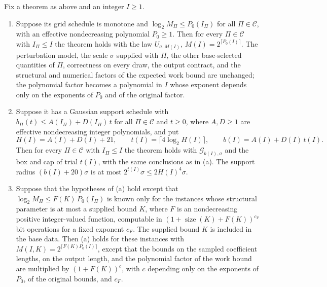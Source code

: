 \begin{corollary}\label{cor:count:universal-law}
Fix a theorem as above and an integer $I\ge1$.
\begin{enumerate}[label=(\alph*)]
\item\label{it:count:ul-grid} Suppose its grid schedule is monotone and
 $\log_2M_\Pi\le P_0(I_\Pi)$ for all $\Pi\in\mathcal C$, with an effective
 nondecreasing polynomial $P_0\ge1$. Then for every $\Pi\in\mathcal C$ with
 $I_\Pi\le I$ the theorem holds with the law $U_{\sigma,M(I)}$,
 $M(I)=2^{\lceil P_0(I)\rceil}$. The perturbation model, the scale $\sigma$
 supplied with $\Pi$, the other base-selected quantities of $\Pi$,
 correctness on every draw, the output contract, and the structural and
 numerical factors of the expected work bound are unchanged; the polynomial
 factor becomes a polynomial in $I$ whose exponent depends only on the
 exponents of $P_0$ and of the original factor.
\item\label{it:count:ul-gauss} Suppose it has a Gaussian support schedule
 with $b_\Pi(t)\le A(I_\Pi)+D(I_\Pi)\,t$ for all $\Pi\in\mathcal C$ and
 $t\ge0$, where $A,D\ge1$ are effective nondecreasing integer polynomials, and
 put
 \[
  H(I)=A(I)+D(I)+21,\qquad t(I)=\lceil4\log_2H(I)\rceil,\qquad
  b(I)=A(I)+D(I)\,t(I).
 \]
 Then for every $\Pi\in\mathcal C$ with $I_\Pi\le I$ the theorem holds with
 $\mathcal G_{b(I),\sigma}$ and the box and cap of trial $t(I)$, with the
 same conclusions as in (a). The support radius $(b(I)+20)\sigma$ is at most
 $2^{t(I)}\sigma\le2H(I)^4\sigma$.
\item\label{it:count:ul-param} Suppose that the hypotheses of (a) hold except
 that $\log_2M_\Pi\le F(K)\,P_0(I_\Pi)$ is known only for the instances whose
 structural parameter is at most a supplied bound $K$, where $F$ is an
 nondecreasing positive integer-valued function, computable in
 $(1+\operatorname{size}(K)+F(K))^{c_F}$ bit operations for a fixed
 exponent $c_F$. The supplied bound $K$ is included in the base data.
 Then (a) holds for these instances with
 $M(I,K)=2^{\lceil F(K)P_0(I)\rceil}$, except that the bounds on the sampled
 coefficient lengths, on the output length, and the polynomial factor of the
 work bound are multiplied by $(1+F(K))^{c}$, with $c$ depending only on the
 exponents of $P_0$, of the original bounds, and $c_F$.
\end{enumerate}
\end{corollary}

